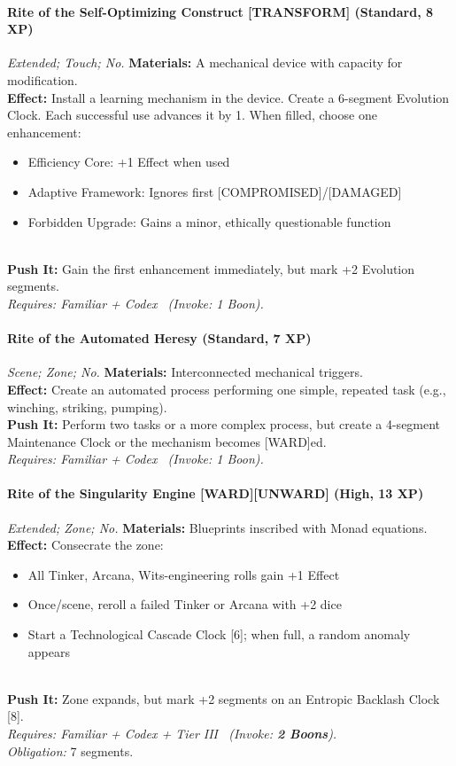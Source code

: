 \paragraph{Rite of the Self-Optimizing Construct \textnormal{[TRANSFORM]} (Standard, 8 XP)} \emph{Extended; Touch; No.}
\textbf{Materials:} A mechanical device with capacity for modification. \\
\textbf{Effect:} Install a learning mechanism in the device. Create a 6-segment Evolution Clock. Each successful use advances it by 1. When filled, choose one enhancement:
\begin{itemize}
  \item Efficiency Core: +1 Effect when used
  \item Adaptive Framework: Ignores first [COMPROMISED]/[DAMAGED]
  \item Forbidden Upgrade: Gains a minor, ethically questionable function
\end{itemize} \\
\textbf{Push It:} Gain the first enhancement immediately, but mark +2 Evolution segments. \\
\emph{Requires: Familiar + Codex \ (\textit{Invoke:} 1 Boon).}

\paragraph{Rite of the Automated Heresy (Standard, 7 XP)} \emph{Scene; Zone; No.}
\textbf{Materials:} Interconnected mechanical triggers. \\
\textbf{Effect:} Create an automated process performing one simple, repeated task (e.g., winching, striking, pumping). \\
\textbf{Push It:} Perform two tasks or a more complex process, but create a 4-segment Maintenance Clock or the mechanism becomes [WARD]ed. \\
\emph{Requires: Familiar + Codex \ (\textit{Invoke:} 1 Boon).}

\paragraph{Rite of the Singularity Engine \textnormal{[WARD][UNWARD]} (High, 13 XP)} \emph{Extended; Zone; No.}
\textbf{Materials:} Blueprints inscribed with Monad equations. \\
\textbf{Effect:} Consecrate the zone:
\begin{itemize}
  \item All Tinker, Arcana, Wits-engineering rolls gain +1 Effect
  \item Once/scene, reroll a failed Tinker or Arcana with +2 dice
  \item Start a Technological Cascade Clock [6]; when full, a random anomaly appears
\end{itemize} \\
\textbf{Push It:} Zone expands, but mark +2 segments on an Entropic Backlash Clock [8]. \\
\emph{Requires: Familiar + Codex + Tier III \ (\textit{Invoke:} \textbf{2 Boons}).} \\
\emph{Obligation:} 7 segments.

